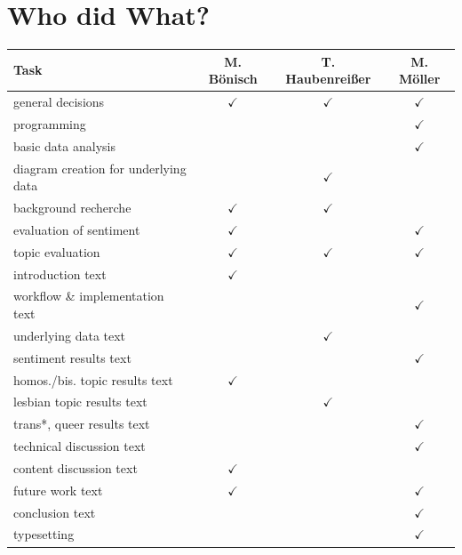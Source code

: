 \documentclass[10pt,a4paper,twocolumn]{scrartcl}
\begin{document}
{\footnotesize }

\onecolumn

\newpage

\section*{Who did What?}

\renewcommand{\arraystretch}{1.5}
\begin{center}
\begin{tabular}{lccc}
\toprule
Task		& M. Bönisch & T. Haubenreißer & M. Möller\\
\midrule
general decisions & $\checkmark$ & $\checkmark$ & $\checkmark$\\
programming & & & $\checkmark$\\
basic data analysis  & & & $\checkmark$\\
diagram creation for underlying data & & $\checkmark$ &\\
background recherche & $\checkmark$ & $\checkmark$ & \\
evaluation of sentiment & $\checkmark$ & & $\checkmark$\\
topic evaluation & $\checkmark$ & $\checkmark$ & $\checkmark$\\
introduction text & $\checkmark$ & & \\
workflow \& implementation text & & & $\checkmark$\\
underlying data text & & $\checkmark$ &\\
sentiment results text & & & $\checkmark$\\
homos./bis. topic results text & $\checkmark$ & & \\
lesbian topic results text & & $\checkmark$ & \\
trans*, queer results text & & & $\checkmark$\\
technical discussion text & & & $\checkmark$\\
content discussion text & $\checkmark$ & &\\
future work text & $\checkmark$ & & $\checkmark$\\
conclusion text & & & $\checkmark$\\
typesetting  & & & $\checkmark$\\
\bottomrule
\end{tabular}
\end{center}
\renewcommand{\arraystretch}{1}
\end{document}
